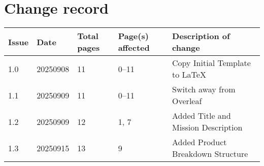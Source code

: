 
\section*{Change record}
\begin{table}[htp]
\centering
\renewcommand{\arraystretch}{1.2} %
\begin{tabularx}{\textwidth}{|l|l|l|l|X|}
\hline
Issue & Date & Total pages & Page(s) affected & Description of change \\
\hline
1.0 & 20250908 & 11 & 0--11 & Copy Initial Template to LaTeX \\
\hline
1.1 & 20250909 & 11 & 0--11 & Switch away from Overleaf \\
\hline
1.2 & 20250909 & 12 & 1, 7 & Added Title and Mission Description \\
\hline
1.3 & 20250915 & 13 & 9 & Added Product Breakdown Structure \\
\hline
\end{tabularx}
\end{table}

